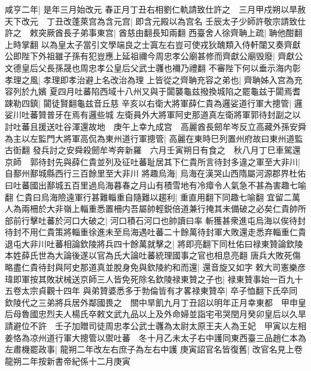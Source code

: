 咸亨二年|{
	是年三月始改元}
春正月丁丑右相劉仁軌請致仕許之　三月甲戍朔以旱赦天下改元　丁丑改蓬萊宫為含元宫|{
	即含元殿以為宫名}
壬辰太子少師許敬宗請致仕許之　敕突厥酋長子弟事東宫|{
	酋慈由翻長知兩翻}
西臺舍人徐齊聃上疏|{
	聃他酣翻上時掌翻}
以為皇太子當引文學端良之士寘左右豈可使戎狄醜類入侍軒闥又奏齊獻公即陛下外祖雖子孫有犯豈應上延祖禰今周忠孝公廟甚修而齊獻公廟毁廢|{
	齊獻公文德皇后父長孫晟也周忠孝公皇后父武士彠也襧乃禮翻}
不審陛下何以垂示海内彰孝理之風|{
	孝理即孝治避上名改治為理}
上皆從之齊聃充容之弟也|{
	齊聃姊入宫為充容列於九嬪}
夏四月吐蕃陷西域十八州又與于闐襲龜兹撥換城陷之罷龜兹于闐焉耆踈勒四鎮|{
	闐徒賢翻龜兹音丘慈}
辛亥以右衛大將軍薛仁貴為邏娑道行軍大摠管|{
	邏娑川吐蕃贊普牙在焉有邏些城}
左衛員外大將軍阿史那道真左衛將軍郭待封副之以討吐蕃且援送吐谷渾還故地　庚午上幸九成宫　高麗酋長劒牟岑反立高藏外孫安舜為主以左監門大將軍高侃為東州道行軍摠管|{
	高麗在東時巳列置州府故曰東州道監古衘翻}
發兵討之安舜殺劒牟岑奔新羅　六月壬寅朔日有食之　秋八月丁巳車駕還京師　郭待封先與薛仁貴並列及征吐蕃耻居其下仁貴所言待封多違之軍至大非川|{
	自鄯州鄯城縣西行三百餘里至大非川}
將趣烏海|{
	烏海在漢哭山西隋屬河源郡界杜佑曰吐蕃國出鄯城五百里過烏海暮春之月山有積雪地有冷瘴令人氣急不甚為害趣七喻翻}
仁貴曰烏海險遠軍行甚難輜重自隨難以趨利|{
	重直用翻下同趣七喻翻}
宜留二萬人為兩柵於大非嶺上輜重悉置柵内吾屬帥輕鋭倍道兼行掩其未備破之必矣仁貴帥所部前行擊吐蕃於河口大破之|{
	河口積石河口也帥讀曰率}
斬獲甚衆進屯烏海以俟待封待封不用仁貴策將輜重徐進未至烏海遇吐蕃二十餘萬待封軍大敗還走悉弃輜重仁貴退屯大非川吐蕃相論欽陵將兵四十餘萬就擊之|{
	將即亮翻下同杜佑曰禄東贊論欽陵本姓薛氏世為大論後遂以官為氏大論吐蕃統理國事之官也相息亮翻}
唐兵大敗死傷略盡仁貴待封與阿史那道真並脫身免與欽陵約和而還|{
	還音旋又如字}
敕大司憲樂彦瑋即軍按其敗狀械送京師三人皆免死除名欽陵禄東贊之子也|{
	禄東贊事始一百九十五卷太宗貞觀十四年}
與弟贊婆悉多于勃倫皆有才畧禄東贊卒|{
	卒子恤翻下氏卒同}
欽陵代之三弟將兵居外鄰國畏之　關中旱飢九月丁丑詔以明年正月幸東都　甲申皇后母魯國忠烈夫人楊氏卒敕文武九品以上及外命婦並詣宅弔哭閏月癸卯皇后以久旱請避位不許　壬子加贈司徒周忠孝公武士彠為太尉太原王夫人為王妃　甲寅以左相姜恪為凉州道行軍大摠管以禦吐蕃　冬十月乙未太子右中護同東西臺三品趙仁本為左肅機罷政事|{
	龍朔二年改左右庶子為左右中護}
庚寅詔官名皆復舊|{
	改官名見上卷龍朔二年按新書帝紀係十二月庚寅}


